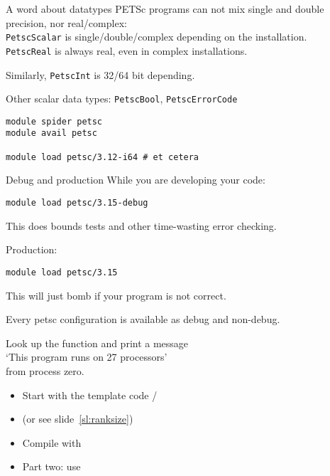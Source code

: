 \begin{frame}[containsverbatim]{A word about datatypes}
PETSc programs can not mix single and double precision, nor real/complex:\\
\lstinline{PetscScalar} is single/double/complex depending on the installation.\\
\lstinline{PetscReal} is always real, even in complex installations.

Similarly, \lstinline{PetscInt} is 32/64 bit depending.

Other scalar data types: \lstinline{PetscBool}, \lstinline{PetscErrorCode}

\begin{taccnote}
\begin{verbatim}
module spider petsc
module avail petsc

module load petsc/3.12-i64 # et cetera
\end{verbatim}
\end{taccnote}

\end{frame}

\begin{frame}[containsverbatim]{Debug and production}
While you are developing your code:
\begin{verbatim}
module load petsc/3.15-debug
\end{verbatim}
This does bounds tests and other time-wasting error checking.

Production:
\begin{verbatim}
module load petsc/3.15
\end{verbatim}
This will just bomb if your program is not correct.

Every petsc configuration is available as debug and non-debug.
\end{frame}

\begin{exerciseframe}[hello]
Look up the function  and print a message\\
`This program runs on 27 processors'\\
from process zero.

\begin{itemize}
\item Start with the template code /
\item (or see slide~\ref{sl:ranksize})
\item Compile with 
\item Part two: use 
\end{itemize}
\end{exerciseframe}

